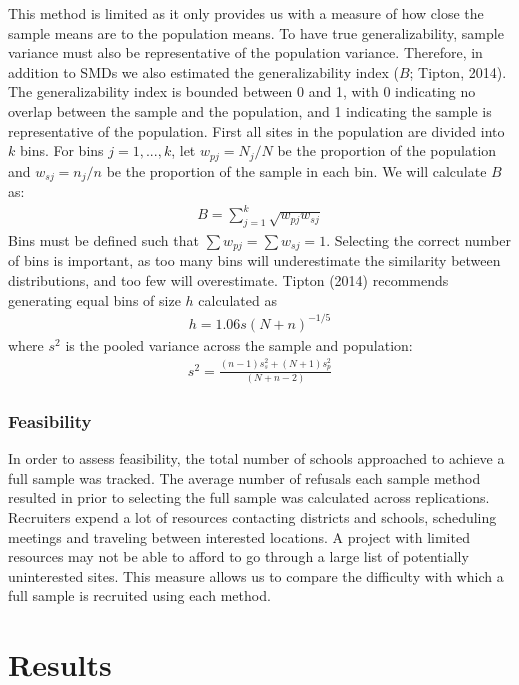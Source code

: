 \documentclass[man,floatsintext]{apa6}
\begin{document}
This method is limited as it only provides us with a measure of how close the sample means are to the population means. To have true generalizability, sample variance must also be representative of the population variance. Therefore, in addition to SMDs we also estimated the generalizability index (\(B\); Tipton, 2014). The generalizability index is bounded between 0 and 1, with 0 indicating no overlap between the sample and the population, and 1 indicating the sample is representative of the population. First all sites in the population are divided into \(k\) bins. For bins \(j = 1,...,k\), let \(w_{pj} = N_j/N\) be the proportion of the population and \(w_{sj} = n_j/n\) be the proportion of the sample in each bin. We will calculate \(B\) as:
\begin{align}
  B = \sum^k_{j=1}\sqrt{w_{pj}w_{sj}}
\end{align}
Bins must be defined such that \(\sum{w_{pj}} = \sum{w_{sj}} = 1\). Selecting the correct number of bins is important, as too many bins will underestimate the similarity between distributions, and too few will overestimate. Tipton (2014) recommends generating equal bins of size \(h\) calculated as
\begin{align}
  h = 1.06s(N+n)^{-1/5}
\end{align}
where \(s^2\) is the pooled variance across the sample and population:
\begin{align}
  s^2 = \frac{(n - 1)s^2_s + (N + 1)s^2_p}{(N + n - 2)}
\end{align}

\hypertarget{feasibility}{%
\subsubsection{Feasibility}\label{feasibility}}

In order to assess feasibility, the total number of schools approached to achieve a full sample was tracked. The average number of refusals each sample method resulted in prior to selecting the full sample was calculated across replications. Recruiters expend a lot of resources contacting districts and schools, scheduling meetings and traveling between interested locations. A project with limited resources may not be able to afford to go through a large list of potentially uninterested sites. This measure allows us to compare the difficulty with which a full sample is recruited using each method.

\hypertarget{results}{%
\section{Results}\label{results}}
\end{document}
